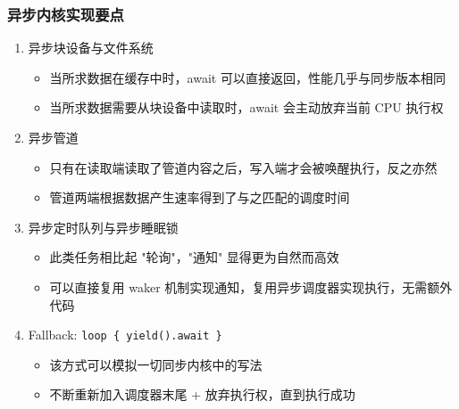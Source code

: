 \begin{frame}
    \frametitle{异步内核实现要点}

    \begin{enumerate}
        \item 异步块设备与文件系统
              \begin{itemize}
                  \item 当所求数据在缓存中时，await 可以直接返回，性能几乎与同步版本相同
                  \item 当所求数据需要从块设备中读取时，await 会主动放弃当前 CPU 执行权
              \end{itemize}
        \item 异步管道
              \begin{itemize}
                  \item 只有在读取端读取了管道内容之后，写入端才会被唤醒执行，反之亦然
                  \item 管道两端根据数据产生速率得到了与之匹配的调度时间
              \end{itemize}
        \item 异步定时队列与异步睡眠锁
              \begin{itemize}
                  \item 此类任务相比起 "轮询"，"通知" 显得更为自然而高效
                  \item 可以直接复用 waker 机制实现通知，复用异步调度器实现执行，无需额外代码
              \end{itemize}
        \item Fallback: \texttt{loop \{ yield().await \}}
              \begin{itemize}
                  \item 该方式可以模拟一切同步内核中的写法
                  \item 不断重新加入调度器末尾 + 放弃执行权，直到执行成功
              \end{itemize}
    \end{enumerate}
\end{frame}



